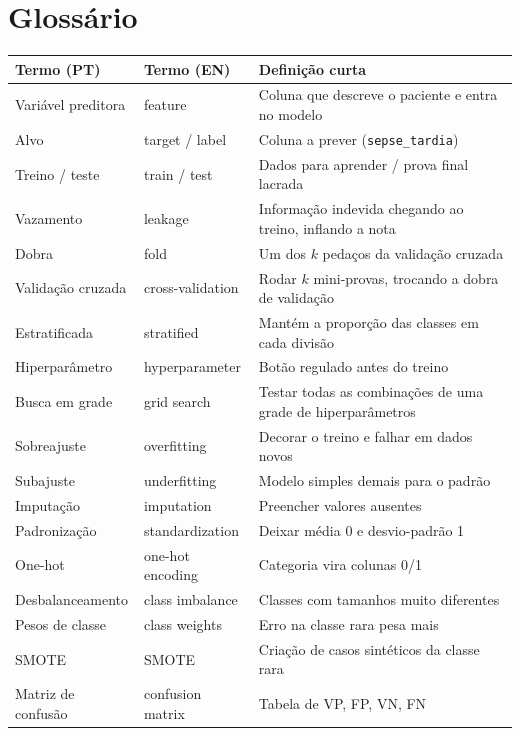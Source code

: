 \documentclass[11pt,a4paper]{article}
\newcommand{\cod}[1]{\texttt{#1}}
\begin{document}
\appendix
\section{Glossário}

\begin{center}
\small
\renewcommand{\arraystretch}{1.2}
\begin{longtable}{@{}p{3.6cm}p{3.6cm}p{7.2cm}@{}}
\toprule
\textbf{Termo (PT)} & \textbf{Termo (EN)} & \textbf{Definição curta} \\
\midrule
\endhead
Variável preditora & feature & Coluna que descreve o paciente e entra no modelo \\
Alvo & target / label & Coluna a prever (\cod{sepse\_tardia}) \\
Treino / teste & train / test & Dados para aprender / prova final lacrada \\
Vazamento & leakage & Informação indevida chegando ao treino, inflando a nota \\
Dobra & fold & Um dos $k$ pedaços da validação cruzada \\
Validação cruzada & cross-validation & Rodar $k$ mini-provas, trocando a dobra de validação \\
Estratificada & stratified & Mantém a proporção das classes em cada divisão \\
Hiperparâmetro & hyperparameter & Botão regulado antes do treino \\
Busca em grade & grid search & Testar todas as combinações de uma grade de hiperparâmetros \\
Sobreajuste & overfitting & Decorar o treino e falhar em dados novos \\
Subajuste & underfitting & Modelo simples demais para o padrão \\
Imputação & imputation & Preencher valores ausentes \\
Padronização & standardization & Deixar média 0 e desvio-padrão 1 \\
One-hot & one-hot encoding & Categoria vira colunas 0/1 \\
Desbalanceamento & class imbalance & Classes com tamanhos muito diferentes \\
Pesos de classe & class weights & Erro na classe rara pesa mais \\
SMOTE & SMOTE & Criação de casos sintéticos da classe rara \\
Matriz de confusão & confusion matrix & Tabela de VP, FP, VN, FN \\

\end{longtable}
\end{center}
\end{document}
